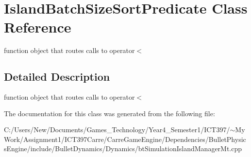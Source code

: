 \hypertarget{class_island_batch_size_sort_predicate}{
\section{IslandBatchSizeSortPredicate Class Reference}
\label{class_island_batch_size_sort_predicate}
}
function object that routes calls to operator$<$  




\subsection{Detailed Description}
function object that routes calls to operator$<$ 

The documentation for this class was generated from the following file:\begin{CompactItemize}
\item 
C:/Users/New/Documents/Games\_\-Technology/Year4\_\-Semester1/ICT397/$\sim$My Work/Assignment1/ICT397Carre/CarreGameEngine/Dependencies/BulletPhysicsEngine/include/BulletDynamics/Dynamics/btSimulationIslandManagerMt.cpp\end{CompactItemize}
